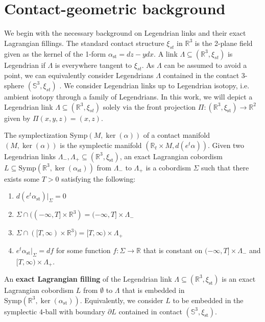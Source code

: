 \documentclass[11pt]{amsart}
\newcommand{\La}{\Lambda}
\newcommand{\R}{\mathbb{R}}
\newcommand{\st}{\text{st}}
\newcommand{\Symp}{\text{Symp}}
\renewcommand{\S}{\mathbb{S}}
\theoremstyle{plain}
\theoremstyle{definition}
\begin{document}
\section{Contact-geometric background}\label{sec: geometric_background}
We begin with the necessary background on Legendrian links and their exact Lagrangian fillings.
 The standard contact structure $\xi_{st}$ in $\R^3$ is the 2-plane field given as the kernel of the 1-form $\alpha_{\st}=dz-ydx$. A link $\La \subseteq (\R^3, \xi_{st})$ is Legendrian if $\La$ is everywhere tangent to $\xi_{st}$. As $\La$ can be assumed to avoid a point, we can equivalently consider Legendrians $\La$ contained in the contact 3-sphere $(\mathbb{S}^3, \xi_{st})$ \cite[Section 3.2]{Geiges08}. We consider Legendrian links up to Legendrian isotopy, i.e. ambient isotopy through a family of Legendrians. 
In this work, we will depict a Legendrian link $\La \subseteq (\R^3, \xi_{st})$ solely via the front projection $\Pi:(\R^3, \xi_{\st}) \to \R^2$ given by $\Pi(x, y, z)=(x, z)$.

The symplectization $\Symp(M, \ker(\alpha))$ of a contact manifold $(M, \ker(\alpha))$ is the symplectic manifold $(\R_t\times M, d(e^t\alpha))$. Given two Legendrian links $\La_-, \La_+\subseteq (\R^3,\xi_{\st})$,  an exact Lagrangian cobordism $L\subseteq \Symp(\R^3, \ker(\alpha_{\st}))$ from $\La_-$ to $\La_+$ is a cobordism $\Sigma$ such that there exists some $T>0$ satisfying the following: 

	\begin{enumerate}
		\item $d(e^t\alpha_{\st})|_\Sigma=0$ %
		\item $\Sigma\cap ((-\infty, T]\times \R^3)=(-\infty, T]\times \La_-$ %
		\item $\Sigma\cap ([T, \infty)\times \R^3)=[T, \infty) \times \La_+$ %
		\item $e^t\alpha_{\st}|_\Sigma=df$ for some function $f: \Sigma\to \R$ that is constant on $(-\infty, T]\times \La_-$ and $[T, \infty)\times \La_+$. %
	\end{enumerate}

	An {\bf exact Lagrangian filling} of the Legendrian link $\La\subseteq (\R^3, \xi_{\st})$ is an exact Lagrangian cobordism $L$ from $\emptyset$ to $\La$ that is embedded in $\Symp(\R^3, \ker(\alpha_{\st}))$. Equivalently, we consider $L$ to be embedded in the symplectic 4-ball with boundary $\partial L$ contained in contact $(\S^3, \xi_{\st})$. 
\end{document}
